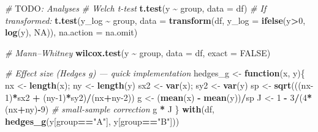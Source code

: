 \documentclass[
  11pt,
]{article}
\newenvironment{Shaded}{\begin{snugshade}}{\end{snugshade}}
\newcommand{\AlertTok}[1]{\textcolor[rgb]{0.94,0.16,0.16}{#1}}
\newcommand{\AttributeTok}[1]{\textcolor[rgb]{0.13,0.29,0.53}{#1}}
\newcommand{\CommentTok}[1]{\textcolor[rgb]{0.56,0.35,0.01}{\textit{#1}}}
\newcommand{\ConstantTok}[1]{\textcolor[rgb]{0.56,0.35,0.01}{#1}}
\newcommand{\ControlFlowTok}[1]{\textcolor[rgb]{0.13,0.29,0.53}{\textbf{#1}}}
\newcommand{\DecValTok}[1]{\textcolor[rgb]{0.00,0.00,0.81}{#1}}
\newcommand{\FunctionTok}[1]{\textcolor[rgb]{0.13,0.29,0.53}{\textbf{#1}}}
\newcommand{\NormalTok}[1]{#1}
\newcommand{\OtherTok}[1]{\textcolor[rgb]{0.56,0.35,0.01}{#1}}
\newcommand{\SpecialCharTok}[1]{\textcolor[rgb]{0.81,0.36,0.00}{\textbf{#1}}}
\newcommand{\StringTok}[1]{\textcolor[rgb]{0.31,0.60,0.02}{#1}}
\begin{document}
\begin{Shaded}
\begin{Highlighting}[]
\CommentTok{\# }\AlertTok{TODO}\CommentTok{: Analyses}
\CommentTok{\# Welch t{-}test}
\FunctionTok{t.test}\NormalTok{(y }\SpecialCharTok{\textasciitilde{}}\NormalTok{ group, }\AttributeTok{data =}\NormalTok{ df)}
\CommentTok{\# If transformed:}
\FunctionTok{t.test}\NormalTok{(y\_log }\SpecialCharTok{\textasciitilde{}}\NormalTok{ group, }\AttributeTok{data =} \FunctionTok{transform}\NormalTok{(df, }\AttributeTok{y\_log =} \FunctionTok{ifelse}\NormalTok{(y}\SpecialCharTok{\textgreater{}}\DecValTok{0}\NormalTok{, }\FunctionTok{log}\NormalTok{(y), }\ConstantTok{NA}\NormalTok{)), }\AttributeTok{na.action =}\NormalTok{ na.omit)}

\CommentTok{\# Mann–Whitney}
\FunctionTok{wilcox.test}\NormalTok{(y }\SpecialCharTok{\textasciitilde{}}\NormalTok{ group, }\AttributeTok{data =}\NormalTok{ df, }\AttributeTok{exact =} \ConstantTok{FALSE}\NormalTok{)}

\CommentTok{\# Effect size (Hedges\textquotesingle{} g) — quick implementation}
\NormalTok{hedges\_g }\OtherTok{\textless{}{-}} \ControlFlowTok{function}\NormalTok{(x, y)\{}
\NormalTok{  nx }\OtherTok{\textless{}{-}} \FunctionTok{length}\NormalTok{(x); ny }\OtherTok{\textless{}{-}} \FunctionTok{length}\NormalTok{(y)}
\NormalTok{  sx2 }\OtherTok{\textless{}{-}} \FunctionTok{var}\NormalTok{(x); sy2 }\OtherTok{\textless{}{-}} \FunctionTok{var}\NormalTok{(y)}
\NormalTok{  sp }\OtherTok{\textless{}{-}} \FunctionTok{sqrt}\NormalTok{(((nx}\DecValTok{{-}1}\NormalTok{)}\SpecialCharTok{*}\NormalTok{sx2 }\SpecialCharTok{+}\NormalTok{ (ny}\DecValTok{{-}1}\NormalTok{)}\SpecialCharTok{*}\NormalTok{sy2)}\SpecialCharTok{/}\NormalTok{(nx}\SpecialCharTok{+}\NormalTok{ny}\DecValTok{{-}2}\NormalTok{))}
\NormalTok{  g }\OtherTok{\textless{}{-}}\NormalTok{ (}\FunctionTok{mean}\NormalTok{(x) }\SpecialCharTok{{-}} \FunctionTok{mean}\NormalTok{(y))}\SpecialCharTok{/}\NormalTok{sp}
\NormalTok{  J }\OtherTok{\textless{}{-}} \DecValTok{1} \SpecialCharTok{{-}} \DecValTok{3}\SpecialCharTok{/}\NormalTok{(}\DecValTok{4}\SpecialCharTok{*}\NormalTok{(nx}\SpecialCharTok{+}\NormalTok{ny)}\SpecialCharTok{{-}}\DecValTok{9}\NormalTok{)  }\CommentTok{\# small{-}sample correction}
\NormalTok{  g }\SpecialCharTok{*}\NormalTok{ J}
\NormalTok{\}}
\FunctionTok{with}\NormalTok{(df, }\FunctionTok{hedges\_g}\NormalTok{(y[group}\SpecialCharTok{==}\StringTok{"A"}\NormalTok{], y[group}\SpecialCharTok{==}\StringTok{"B"}\NormalTok{]))}


\end{Highlighting}
\end{Shaded}
\end{document}
